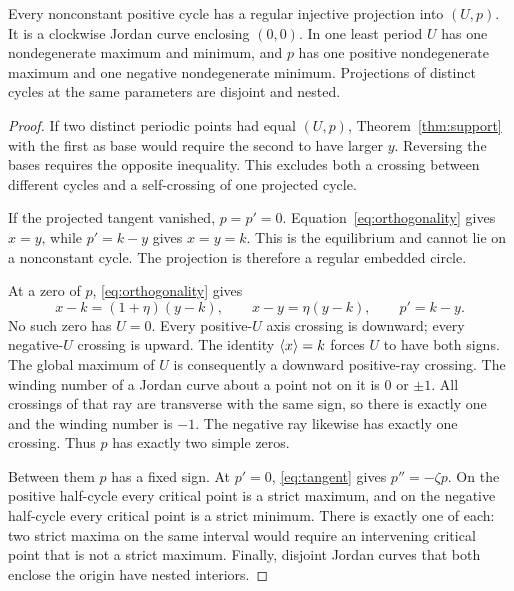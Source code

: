 \begin{theorem}\label{thm:geometry}
Every nonconstant positive cycle has a regular injective projection into $(U,p)$. It is a clockwise Jordan curve enclosing $(0,0)$. In one least period $U$ has one nondegenerate maximum and minimum, and $p$ has one positive nondegenerate maximum and one negative nondegenerate minimum. Projections of distinct cycles at the same parameters are disjoint and nested.
\end{theorem}
\begin{proof}
If two distinct periodic points had equal $(U,p)$, Theorem~\ref{thm:support} with the first as base would require the second to have larger $y$. Reversing the bases requires the opposite inequality. This excludes both a crossing between different cycles and a self-crossing of one projected cycle.

If the projected tangent vanished, $p=p'=0$. Equation~\eqref{eq:orthogonality} gives $x=y$, while $p'=k-y$ gives $x=y=k$. This is the equilibrium and cannot lie on a nonconstant cycle. The projection is therefore a regular embedded circle.

At a zero of $p$, \eqref{eq:orthogonality} gives
\begin{equation}\label{eq:crestidentities}
x-k=(1+\eta)(y-k),\qquad x-y=\eta(y-k),\qquad p'=k-y.
\end{equation}
No such zero has $U=0$. Every positive-$U$ axis crossing is downward; every negative-$U$ crossing is upward. The identity $\left\langle x\right\rangle=k$ forces $U$ to have both signs. The global maximum of $U$ is consequently a downward positive-ray crossing. The winding number of a Jordan curve about a point not on it is $0$ or $\pm1$. All crossings of that ray are transverse with the same sign, so there is exactly one and the winding number is $-1$. The negative ray likewise has exactly one crossing. Thus $p$ has exactly two simple zeros.

Between them $p$ has a fixed sign. At $p'=0$, \eqref{eq:tangent} gives $p''=-\zeta p$. On the positive half-cycle every critical point is a strict maximum, and on the negative half-cycle every critical point is a strict minimum. There is exactly one of each: two strict maxima on the same interval would require an intervening critical point that is not a strict maximum. Finally, disjoint Jordan curves that both enclose the origin have nested interiors.
\end{proof}

